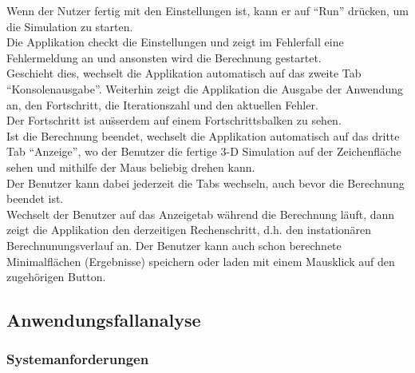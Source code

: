 Wenn der Nutzer fertig mit den Einstellungen ist, kann er auf "`Run"'  dr\"ucken, um die Simulation zu starten. \\
Die Applikation checkt die Einstellungen und zeigt im Fehlerfall eine Fehlermeldung an und ansonsten wird die Berechnung gestartet.\\
Geschieht dies, wechselt die Applikation automatisch auf das zweite Tab "`Konsolenausgabe"'.
Weiterhin zeigt die Applikation die Ausgabe der Anwendung an, den Fortschritt, die Iterationszahl und den aktuellen Fehler.\\
Der Fortschritt ist au\" sserdem auf einem Fortschrittsbalken zu sehen.\\
Ist die Berechnung beendet, wechselt die Applikation automatisch auf das dritte Tab "`Anzeige"', wo der Benutzer die fertige 3-D Simulation auf der Zeichenfl\"ache sehen und mithilfe der Maus beliebig drehen kann.\\
Der Benutzer kann dabei jederzeit die Tabs wechseln, auch bevor die Berechnung beendet ist.\\
Wechselt der Benutzer auf das Anzeigetab w\"ahrend die Berechnung l\"auft, dann zeigt die Applikation den derzeitigen Rechenschritt, d.h. den instation\"aren Berechnunungsverlauf an.
Der Benutzer kann auch schon berechnete Minimalfl\"achen (Ergebnisse) speichern oder laden mit einem Mausklick auf den zugeh\"origen Button.\\





\subsection{Anwendungsfallanalyse}


\subsubsection{Systemanforderungen}






